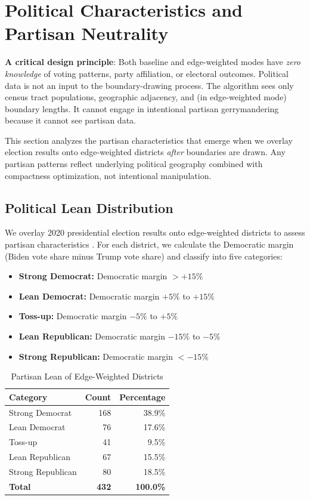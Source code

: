 \section{Political Characteristics and Partisan Neutrality}

\textbf{A critical design principle}: Both baseline and edge-weighted modes have \textit{zero knowledge} of voting patterns, party affiliation, or electoral outcomes. Political data is not an input to the boundary-drawing process. The algorithm sees only census tract populations, geographic adjacency, and (in edge-weighted mode) boundary lengths. It cannot engage in intentional partisan gerrymandering because it cannot see partisan data.

This section analyzes the partisan characteristics that emerge when we overlay election results onto edge-weighted districts \textit{after} boundaries are drawn. Any partisan patterns reflect underlying political geography combined with compactness optimization, not intentional manipulation.

\subsection{Political Lean Distribution}

We overlay 2020 presidential election results onto edge-weighted districts to assess partisan characteristics \cite{medsl2020}. For each district, we calculate the Democratic margin (Biden vote share minus Trump vote share) and classify into five categories:

\begin{itemize}
    \item \textbf{Strong Democrat:} Democratic margin $> +15\%$
    \item \textbf{Lean Democrat:} Democratic margin $+5\%$ to $+15\%$
    \item \textbf{Toss-up:} Democratic margin $-5\%$ to $+5\%$
    \item \textbf{Lean Republican:} Democratic margin $-15\%$ to $-5\%$
    \item \textbf{Strong Republican:} Democratic margin $< -15\%$
\end{itemize}

\begin{table}[h]
\centering
\caption{Partisan Lean of Edge-Weighted Districts}
\begin{tabular}{lrr}
\toprule
\textbf{Category} & \textbf{Count} & \textbf{Percentage} \\
\midrule
Strong Democrat & 168 & 38.9\% \\
Lean Democrat & 76 & 17.6\% \\
Toss-up & 41 & 9.5\% \\
Lean Republican & 67 & 15.5\% \\
Strong Republican & 80 & 18.5\% \\
\midrule
\textbf{Total} & \textbf{432} & \textbf{100.0\%} \\
\bottomrule
\end{tabular}
\end{table}

